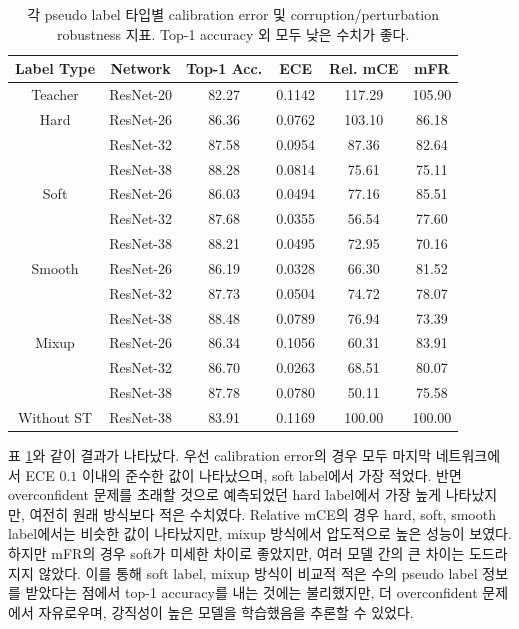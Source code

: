 \documentclass[a4paper, 10pt]{article}
\begin{document}
\begin{table}[!h]
  \center
  \begin{tabular}{ |c|c|c|c|c|c| }
    \hline
      Label Type & Network & Top-1 Acc. & ECE & Rel. mCE & mFR \\ \hline
      Teacher & ResNet-20 & 82.27 & 0.1142 & 117.29 & 105.90 \\ \hline
      Hard & ResNet-26 & 86.36 & 0.0762 & 103.10 & 86.18 \\ 
       & ResNet-32 & 87.58 & 0.0954 & 87.36 & 82.64 \\ 
       & ResNet-38 & 88.28 & 0.0814 & 75.61 & 75.11 \\ \hline
      Soft & ResNet-26 & 86.03 & 0.0494 & 77.16 & 85.51 \\
       & ResNet-32 & 87.68 & 0.0355 & 56.54 & 77.60 \\ 
       & ResNet-38 & 88.21 & 0.0495 & 72.95 & 70.16 \\ \hline
      Smooth & ResNet-26 & 86.19 & 0.0328 & 66.30 & 81.52 \\
       & ResNet-32 & 87.73 & 0.0504 & 74.72 & 78.07 \\ 
       & ResNet-38 & 88.48 & 0.0789 & 76.94 & 73.39 \\ \hline
      Mixup & ResNet-26 & 86.34 & 0.1056 & 60.31 & 83.91 \\
       & ResNet-32 & 86.70 & 0.0263 & 68.51 & 80.07 \\ 
       & ResNet-38 & 87.78 & 0.0780 & 50.11 & 75.58 \\ \hline
      Without ST & ResNet-38 & 83.91 & 0.1169 & 100.00 & 100.00 \\ \hline
  \end{tabular}    
  \caption{각 pseudo label 타입별 calibration error 및 corruption/perturbation robustness 지표. Top-1 accuracy 외 모두 낮은 수치가 좋다.}
  \label{robustness}
\end{table}

표 \ref{robustness}와 같이 결과가 나타났다. 우선 calibration error의 경우 모두
마지막 네트워크에서 ECE $0.1$ 이내의 준수한 값이 나타났으며, soft label에서 가장
적었다. 반면 overconfident 문제를 초래할 것으로 예측되었던 hard label에서 가장
높게 나타났지만, 여전히 원래 방식보다 적은 수치였다. Relative mCE의 경우 hard,
soft, smooth label에서는 비슷한 값이 나타났지만, mixup 방식에서 압도적으로 높은
성능이 보였다. 하지만 mFR의 경우 soft가 미세한 차이로 좋았지만, 여러 모델 간의
큰 차이는 도드라지지 않았다. 이를 통해 soft label, mixup 방식이 비교적 적은 수의
pseudo label 정보를 받았다는 점에서 top-1 accuracy를 내는 것에는 불리했지만, 더
overconfident 문제에서 자유로우며, 강직성이 높은 모델을 학습했음을 추론할 수
있었다.
\end{document}
